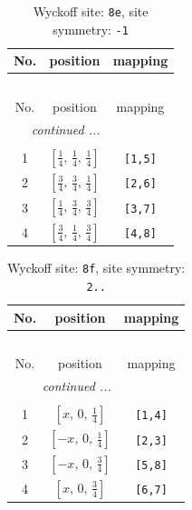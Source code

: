 \documentclass[fleqn,8pt]{jsarticle}
\begin{document}
\begin{longtable}{ccc}
\caption{Wyckoff site: {\tt 8e}, site symmetry: {\tt -1}}
 \\
 \hline \hline
No. & position & mapping \\ \hline \endfirsthead

\multicolumn{2}{l}{\tablename\ \thetable{}} \\
 \hline \hline
No. & position & mapping \\ \hline \endhead

 \hline \hline
\multicolumn{2}{r}{\footnotesize\it continued ...} \\ \endfoot

 \hline \hline
\multicolumn{2}{r}{} \\ \endlastfoot

1 & $\left[ \frac{1}{4},\, \frac{1}{4},\, \frac{1}{4} \right]$ & {\tt [1,5]} \\ \hline
2 & $\left[ \frac{3}{4},\, \frac{3}{4},\, \frac{1}{4} \right]$ & {\tt [2,6]} \\ \hline
3 & $\left[ \frac{1}{4},\, \frac{3}{4},\, \frac{3}{4} \right]$ & {\tt [3,7]} \\ \hline
4 & $\left[ \frac{3}{4},\, \frac{1}{4},\, \frac{3}{4} \right]$ & {\tt [4,8]} \\
\end{longtable}
\renewcommand{\arraystretch}{1.2}
\begin{longtable}{ccc}
\caption{Wyckoff site: {\tt 8f}, site symmetry: {\tt 2..}}
 \\
 \hline \hline
No. & position & mapping \\ \hline \endfirsthead

\multicolumn{2}{l}{\tablename\ \thetable{}} \\
 \hline \hline
No. & position & mapping \\ \hline \endhead

 \hline \hline
\multicolumn{2}{r}{\footnotesize\it continued ...} \\ \endfoot

 \hline \hline
\multicolumn{2}{r}{} \\ \endlastfoot

1 & $\left[ x,\, 0,\, \frac{1}{4} \right]$ & {\tt [1,4]} \\ \hline
2 & $\left[ - x,\, 0,\, \frac{1}{4} \right]$ & {\tt [2,3]} \\ \hline
3 & $\left[ - x,\, 0,\, \frac{3}{4} \right]$ & {\tt [5,8]} \\ \hline
4 & $\left[ x,\, 0,\, \frac{3}{4} \right]$ & {\tt [6,7]} \\
\end{longtable}
\end{document}
